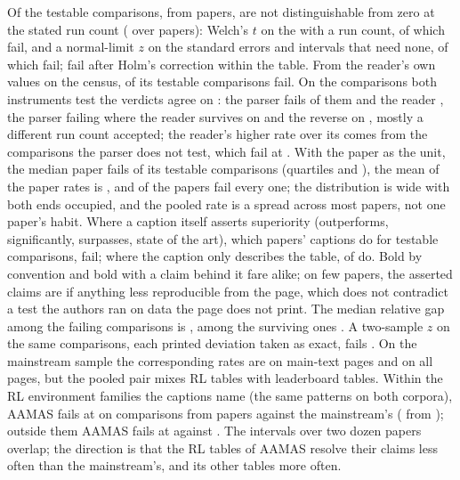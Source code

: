 \documentclass[sigconf,anonymous]{aamas}
\begin{document}
Of the \nANTestable{} testable comparisons, from \nAPapersTestable{} papers,
\nAPctFail{} are not distinguishable from zero at the stated run count
(\nAPctFailCi{} over papers): Welch's $t$ on the \nWelchN{} with a run
count, \nWelchFail{} of which fail, and a normal-limit $z$ on the \nZN{}
standard errors and intervals that need none, \nZFail{} of which fail;
\nAPctFailHolm{} fail after Holm's correction within the table. From the
reader's own values on the census, \nCzReaderFail{} of its
\nCzReaderFailN{} testable comparisons fail. On the \nCzShared{}
comparisons both instruments test the verdicts agree on \nCzSharedAgree{}:
the parser fails \nCzSharedPipeFailPct{} of them and the reader
\nCzSharedReaderFailPct{}, the parser failing where the reader survives on
\nCzSharedPipeFailsReaderSurvives{} and the reverse on
\nCzSharedReaderFailsPipeSurvives{}, mostly a different run count
accepted; the reader's higher rate over its \nCzReaderFailN{} comes from
the \nCzReaderOnlyN{} comparisons the parser does not test, which fail at
\nCzReaderOnlyFailPct{}. With the paper as the unit, the median paper
fails \nPpMedian{} of its testable comparisons (quartiles \nPpQOne{} and
\nPpQThree{}), the mean of the paper rates is \nPpMean{}, and
\nPpAllFail{} of the \nPpPapers{} papers fail every one; the distribution
is wide with both ends occupied, and the pooled rate is a spread across
most papers, not one paper's habit. Where
a caption itself asserts superiority (outperforms, significantly, surpasses,
state of the art), which \nCapAssertingPapers{} papers' captions do for
\nCapAssertingN{} testable comparisons, \nCapAssertingFail{} fail; where
the caption only describes the table, \nCapDescribingFail{} of
\nCapDescribingN{} do. Bold by convention and bold with a claim behind it
fare alike; on few papers, the asserted claims are if anything less
reproducible from the page, which does not contradict a test the authors
ran on data the page does not print. The median relative gap among the failing
comparisons is \nAGapFail{}, among the surviving ones \nAGapPass{}. A
two-sample $z$ on the same comparisons, each printed deviation taken as
exact, fails \nSpanZTwoSidedFail{}. On the mainstream sample the
corresponding rates are \nMlMainFail{} on main-text pages and \nMlPctFail{}
on all pages, but the pooled pair mixes RL tables with leaderboard tables.
Within the RL environment families the captions name (the same patterns
on both corpora), AAMAS fails at \nFmAamasRlFail{} \nFmAamasRlFailCi{} on
\nFmAamasRlN{} comparisons from \nFmAamasRlPapers{} papers against the
mainstream's \nFmMlRlFail{} \nFmMlRlFailCi{} (\nFmMlRlN{} from
\nFmMlRlPapers{}); outside them AAMAS fails at \nFmAamasRestFail{}
\nFmAamasRestFailCi{} against \nFmMlRestFail{} \nFmMlRestFailCi{}. The
intervals over two dozen papers overlap; the direction is that the RL
tables of AAMAS resolve their claims less often than the mainstream's, and
its other tables more often.
\end{document}
